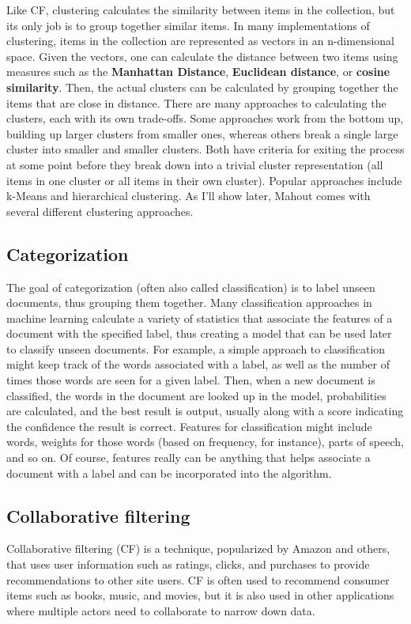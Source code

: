 \documentclass[11pt]{article} %
\begin{document}
Like CF, clustering calculates the similarity between items in the collection, but its only job is to group together similar items. In many implementations of clustering, items in the collection are represented as vectors in an n-dimensional space. Given the vectors, one can calculate the distance between two items using measures such as the \textbf{Manhattan Distance}, \textbf{Euclidean distance}, or \textbf{cosine similarity}. Then, the actual clusters can be calculated by grouping together the items that are close in distance.
There are many approaches to calculating the clusters, each with its own trade-offs. Some approaches work from the bottom up, building up larger clusters from smaller ones, whereas others break a single large cluster into smaller and smaller clusters. Both have criteria for exiting the process at some point before they break down into a trivial cluster representation (all items in one cluster or all items in their own cluster). Popular approaches include k-Means and hierarchical clustering. As I'll show later, Mahout comes with several different clustering approaches.

\subsection{Categorization}
The goal of categorization (often also called classification) is to label unseen documents, thus grouping them together. Many classification approaches in machine learning calculate a variety of statistics that associate the features of a document with the specified label, thus creating a model that can be used later to classify unseen documents. For example, a simple approach to classification might keep track of the words associated with a label, as well as the number of times those words are seen for a given label. Then, when a new document is classified, the words in the document are looked up in the model, probabilities are calculated, and the best result is output, usually along with a score indicating the confidence the result is correct.
Features for classification might include words, weights for those words (based on frequency, for instance), parts of speech, and so on. Of course, features really can be anything that helps associate a document with a label and can be incorporated into the algorithm.
\subsection{Collaborative filtering}
Collaborative filtering (CF) is a technique, popularized by Amazon and others, that uses user information such as ratings, clicks, and purchases to provide recommendations to other site users. CF is often used to recommend consumer items such as books, music, and movies, but it is also used in other applications where multiple actors need to collaborate to narrow down data.
\end{document}
